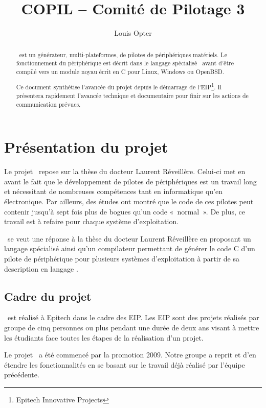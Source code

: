 \documentclass[francais]{rtxreport}
\author{Louis Opter}
\title{COPIL -- Comité de Pilotage 3}
\begin{document}
\maketitle

\begin{abstract}
\rtx\ est un générateur, multi-plateformes, de pilotes de périphériques
matériels. Le fonctionnement du périphérique est décrit dans le langage
spécialisé \rtx\ avant d'être compilé vers un module noyau écrit en C pour
Linux, Windows ou OpenBSD.

Ce document synthétise l'avancée du projet depuis le démarrage de
l'EIP\footnote{Epitech Innovative Projects}. Il présentera rapidement l’avancée
technique et documentaire pour finir sur les actions de communication prévues.
\end{abstract}

\rtxmaketitleblock

\tableofcontents

\chapter{Présentation du projet}

Le projet \rtx\ repose sur la thèse du docteur Laurent Réveillère. Celui-ci met
en avant le fait que le développement de pilotes de périphériques est un travail
long et nécessitant de nombreuses compétences tant en informatique qu'en
électronique. Par ailleurs, des études ont montré que le code de ces pilotes
peut contenir jusqu'à sept fois plus de bogues qu'un code «~normal~». De plus,
ce travail est à refaire pour chaque système d'exploitation.

\rtx\ se veut une réponse à la thèse du docteur Laurent Réveillère en proposant
un langage spécialisé ainsi qu'un compilateur permettant de générer le code C
d'un pilote de périphérique pour plusieurs systèmes d'exploitation à partir de
sa description en langage \rtx.

\section{Cadre du projet}
\rtx\ est réalisé à Epitech dans le cadre des EIP. Les EIP sont des projets
réalisés par groupe de cinq personnes ou plus pendant une durée de deux ans
visant à mettre les étudiants face toutes les étapes de la réalisation d'un
projet.

Le projet \rtx\ a été commencé par la promotion 2009. Notre groupe a reprit et
d'en étendre les fonctionnalités en se basant sur le travail déjà réalisé par
l'équipe précédente.
\end{document}
